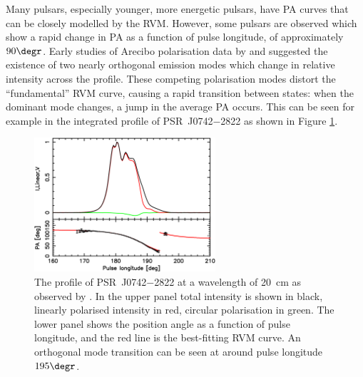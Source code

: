Many pulsars, especially younger, more energetic pulsars, have PA curves that can be closely modelled by the RVM. 
However, some pulsars are observed which show a rapid change in PA as a function of pulse longitude, of approximately $90\degr$. 
Early studies of Arecibo polarisation data by \citet{RCBx1974} and  \citet{BRCx1976} suggested the existence of two nearly orthogonal emission modes which change in relative intensity across the profile.
These competing polarisation modes distort the ``fundamental'' RVM curve, causing a rapid transition between states: when the dominant mode changes, a jump in the average PA occurs. This can be seen for example in the integrated profile of PSR~J0742$-$2822 as shown in Figure \ref{fig: intro - J0742 OPMs}.
\begin{figure}
    \begin{center}
        \includegraphics[width=0.6\textwidth]{Figures/Introduction/opm_profile}
        \caption[Orthogonal polarisation modes in PSR~J0742$-$2822]{The profile of PSR~J0742$-$2822 at a wavelength of 20~cm as observed by \citet{RWJx2015a}. In the upper panel total intensity is shown in black, linearly polarised intensity in red, circular polarisation in green. The lower panel shows the position angle as a function of pulse longitude, and the red line is the best-fitting RVM curve. An orthogonal mode transition can be seen at around pulse longitude $195\degr$. }
        \label{fig: intro - J0742 OPMs}
    \end{center}
\end{figure}

